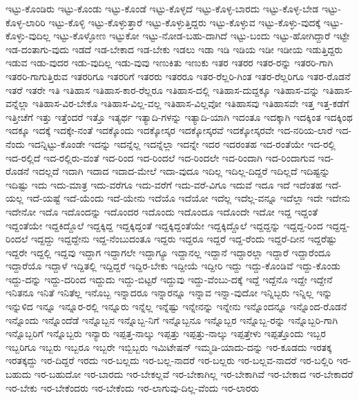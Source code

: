 {ಇಟ್ಟು-ಕೊಂಡಿರು
ಇಟ್ಟು-ಕೊಂಡು
ಇಟ್ಟು-ಕೊಂಡೆ
ಇಟ್ಟು-ಕೊಳ್ಳದೆ
ಇಟ್ಟು-ಕೊಳ್ಳ-ಬಾರದು
ಇಟ್ಟು-ಕೊಳ್ಳ-ಬೇಡ
ಇಟ್ಟು-ಕೊಳ್ಳ-ಲಾರಿರಿ
ಇಟ್ಟು-ಕೊಳ್ಳಿ
ಇಟ್ಟು-ಕೊಳ್ಳುತ್ತಾರೆ
ಇಟ್ಟು-ಕೊಳ್ಳುತ್ತಿದ್ದರು
ಇಟ್ಟು-ಕೊಳ್ಳುವ
ಇಟ್ಟು-ಕೊಳ್ಳು-ವುದಕ್ಕೆ
ಇಟ್ಟು-ಕೊಳ್ಳು-ವುದಿಲ್ಲ
ಇಟ್ಟು-ಕೊಳ್ಳೋಣ
ಇಟ್ಟುಕೋ
ಇಟ್ಟು-ನೋಡ-ಬಹು-ದಾಗಿದೆ
ಇಟ್ಟು-ಬಂದು
ಇಟ್ಟು-ಹೋಗಿದ್ದಾರೆ
ಇಟ್ಟೇ
ಇಡ-ದಂತಾಗು-ವುದು
ಇಡದೆ
ಇಡ-ಬೇಕಾದ
ಇಡ-ಬೇಕು
ಇಡಲು
ಇಡಾ
ಇಡಿ
ಇಡಿಯ
ಇಡೀ
ಇಡೀಯ
ಇಡುತ್ತಿದ್ದರು
ಇಡುವ
ಇಡು-ವುದರ
ಇಡು-ವುದಿಲ್ಲ
ಇಡು-ವುವು
ಇಣುಕಿತು
ಇಣುಕು
ಇತರ
ಇತರರ
ಇತರ-ರನ್ನು
ಇತರರಿ-ಗಾಗಿ
ಇತರರಿ-ಗಾಗುತ್ತಿರುವ
ಇತರರಿಗೂ
ಇತರರಿಗೆ
ಇತರರು
ಇತರರೂ
ಇತರ-ರೆಲ್ಲರಿ-ಗಿಂತ
ಇತರ-ರೆಲ್ಲರಿಗೂ
ಇತರ-ರೊಡನೆ
ಇತರೆ
ಇತರೇ
ಇತಿ
ಇತಿಹಾಸ
ಇತಿಹಾಸ-ಕಾರ-ರೆಲ್ಲರೂ
ಇತಿಹಾಸ-ದಲ್ಲಿ
ಇತಿಹಾಸ-ದುದ್ದಕ್ಕೂ
ಇತಿಹಾಸ-ವನ್ನು
ಇತಿಹಾಸ-ವನ್ನೆಲ್ಲಾ
ಇತಿಹಾಸ-ವಿರ-ಬೇಕೊ
ಇತಿಹಾಸ-ವಿಲ್ಲ-ವಲ್ಲ
ಇತಿಹಾಸ-ವಿಲ್ಲವೋ
ಇತಿಹಾಸವು
ಇತಿಹಾಸವೇ
ಇತ್ತ
ಇತ್ತ-ಕಡೆಗೆ
ಇತ್ತೀಚೆಗೆ
ಇತ್ತು
ಇತ್ತೆಂದರೆ
ಇತ್ತೊ
ಇತ್ಯರ್ಥ
ಇತ್ಯಾದಿ-ಗಳನ್ನು
ಇತ್ಯಾದಿ-ಯಾಗಿ
ಇದಂತೂ
ಇದಕ್ಕಾಗಿ
ಇದಕ್ಕಿಂತ
ಇದಕ್ಕಿಂಥ
ಇದಕ್ಕೂ
ಇದಕ್ಕೆ
ಇದಕ್ಕೇ-ನಂತೆ
ಇದಕ್ಕೊಂದು
ಇದಕ್ಕೋಸ್ಕರ
ಇದಕ್ಕೋಸ್ಕರವೆ
ಇದಕ್ಕೋಸ್ಕರವೇ
ಇದ-ನರಿಯ-ಲಾರೆ
ಇದ-ನೆಂದು
ಇದನ್ನಿಟ್ಟು-ಕೊಂಡೇ
ಇದನ್ನು
ಇದನ್ನೆಲ್ಲ
ಇದನ್ನೆಲ್ಲಾ
ಇದನ್ನೇ
ಇದರ
ಇದರಂತಹ
ಇದ-ರಂತೆಯೇ
ಇದ-ರಲ್ಲಿ
ಇದ-ರಲ್ಲಿದೆ
ಇದ-ರಲ್ಲಿರು-ವಂತೆ
ಇದ-ರಿಂದ
ಇದ-ರಿಂದಲೆ
ಇದ-ರಿಂದಲೇ
ಇದ-ರಿಂದಾಗಿ
ಇದ-ರಿಂದಾಗುವ
ಇದ-ರೊಡನೆ
ಇದಲ್ಲದೆ
ಇದಾಗಿ
ಇದಾದ
ಇದಾದ-ಮೇಲೆ
ಇದಾ-ವುದೂ
ಇದಿಲ್ಲ
ಇದಿಲ್ಲ-ದಿದ್ದರೆ
ಇದಿಲ್ಲದೆ
ಇದಿಷ್ಟನ್ನು
ಇದಿಷ್ಟು
ಇದು
ಇದು-ಮಾತ್ರ
ಇದು-ವರೆಗೂ
ಇದು-ವರೆಗೆ
ಇದು-ವರೆ-ವಿಗೂ
ಇದುವೆ
ಇದೂ
ಇದೆ
ಇದೆಂತಹ
ಇದೆ-ಯಲ್ಲ
ಇದೆ-ಯಷ್ಟೆ
ಇದೆ-ಯೆಂದು
ಇದೆ-ಯೇನು
ಇದೆಯೊ
ಇದೆಯೋ
ಇದೆಲ್ಲ
ಇದೆಲ್ಲ-ವನ್ನೂ
ಇದೆಲ್ಲಾ
ಇದೇ
ಇದೇನು
ಇದೇನೋ
ಇದೊ
ಇದೊಂದನ್ನು
ಇದೊಂದರ
ಇದೊಂದು
ಇದೊಂದೂ
ಇದೊಂದೇ
ಇದೋ
ಇದ್ದ
ಇದ್ದಂತೆ
ಇದ್ದಂತೆಯೇ
ಇದ್ದಕಿದ್ದೊಲೆ
ಇದ್ದಕ್ಕಿದ್ದ
ಇದ್ದಕ್ಕಿದ್ದಂತೆ
ಇದ್ದಕ್ಕಿದ್ದಂತೆಯೇ
ಇದ್ದಕ್ಕಿದ್ದೊಲೆ
ಇದ್ದದ್ದನ್ನು
ಇದ್ದದ್ದ-ರಿಂದ
ಇದ್ದದ್ದ-ರಿಂದಲೆ
ಇದ್ದದ್ದು
ಇದ್ದದ್ದೇನು
ಇದ್ದ-ನೆಂಬುದಂತೂ
ಇದ್ದರು
ಇದ್ದರೂ
ಇದ್ದರೆ
ಇದ್ದ-ರೆಂದು
ಇದ್ದರೆ-ದೀನ
ಇದ್ದರೆಷ್ಟು
ಇದ್ದರೇ
ಇದ್ದಲ್ಲಿ
ಇದ್ದವು
ಇದ್ದಾಗ
ಇದ್ದಾಗಲೇ
ಇದ್ದಾಗ್ಯೂ
ಇದ್ದಾನಲ್ಲ
ಇದ್ದಾನೆ
ಇದ್ದಾರಲ್ಲಾ
ಇದ್ದಾರೆ
ಇದ್ದಾರೆಂದೂ
ಇದ್ದಾರೆಯೊ
ಇದ್ದಾಳೆ
ಇದ್ದಿತಲ್ಲಿ
ಇದ್ದಿದ್ದರೆ
ಇದ್ದಿರ-ಬೇಕು
ಇದ್ದೀಯೆ
ಇದ್ದೀರಿ
ಇದ್ದು
ಇದ್ದು-ಕೊಂಡಿವೆ
ಇದ್ದು-ಕೊಂಡು
ಇದ್ದು-ದನ್ನು
ಇದ್ದು-ದರಿಂದ
ಇದ್ದುದು
ಇದ್ದು-ಬಿಟ್ಟರೆ
ಇದ್ದುವು
ಇದ್ದು-ವೆಂಬು-ದಕ್ಕೆ
ಇದ್ದೆ
ಇದ್ದೆನೊ
ಇದ್ದೇ
ಇದ್ದೇನೆ
ಇನಿತನೂ
ಇನಿತೆ
ಇನಿತೆಲ್ಲ
ಇನೊಬ್ಬ
ಇನ್ನಾದರೂ
ಇನ್ನಾರನ್ನೂ
ಇನ್ನಾವ
ಇನ್ನಾ-ವುದೋ
ಇನ್ನಿಬ್ಬರು
ಇನ್ನಿಲ್ಲ
ಇನ್ನು
ಇನ್ನುಳಿದ
ಇನ್ನೂ
ಇನ್ನೂರ-ರಲ್ಲಿ
ಇನ್ನೂರು
ಇನ್ನೆಲ್ಲ
ಇನ್ನೆಷ್ಟು
ಇನ್ನೇನನ್ನು
ಇನ್ನೇನು
ಇನ್ನೊಂದನ್ನೂ
ಇನ್ನೊಂದ-ರೊಡನೆ
ಇನ್ನೊಂದು
ಇನ್ನೊಂದೆಡೆ
ಇನ್ನೊಬ್ಬನ
ಇನ್ನೊಬ್ಬ-ನಿಗೆ
ಇನ್ನೊಬ್ಬನೂ
ಇನ್ನೊಬ್ಬರ
ಇನ್ನೊಬ್ಬ-ರನ್ನು
ಇನ್ನೊಬ್ಬರಿ-ಗಾಗಿ
ಇನ್ನೊಬ್ಬರಿಗೆ
ಇನ್ನೊಬ್ಬರು
ಇನ್ಯಾರು
ಇಪ್ಪತ್ತ-ನಾಲ್ಕು
ಇಪ್ಪತ್ತು
ಇಪ್ಪತ್ತು-ನಾಲ್ಕು
ಇಪ್ಪತ್ತೇಳು
ಇಪ್ಪತ್ತೊಂದು
ಇಬ್ಬರ
ಇಬ್ಬರಿಗೂ
ಇಬ್ಬರು
ಇಬ್ಬರೂ
ಇಬ್ಬರೇ
ಇಬ್ಬಿಬ್ಬರು
ಇಮಿಟೇಷನ್
ಇಮ್ಮಡಿ-ಯಾದು-ದನ್ನು
ಇರ-ಕೂಡದು
ಇರತಕ್ಕ
ಇರತಕ್ಕದ್ದು
ಇರ-ದಿದ್ದರೆ
ಇರದು
ಇರ-ಬಲ್ಲದು
ಇರ-ಬಲ್ಲ-ನಾದರೆ
ಇರ-ಬಲ್ಲರು
ಇರ-ಬಲ್ಲವ-ನಾದರೆ
ಇರ-ಬಲ್ಲಿರಿ
ಇರ-ಬಹುದು
ಇರ-ಬಹುದೋ
ಇರ-ಬಾರದು
ಇರ-ಬೇಕಲ್ಲವೆ
ಇರ-ಬೇಕಾಗಿಲ್ಲ
ಇರ-ಬೇಕಾಗಿವೆ
ಇರ-ಬೇಕಾದ
ಇರ-ಬೇಕಾದರೆ
ಇರ-ಬೇಕು
ಇರ-ಬೇಕೆಂದರು
ಇರ-ಬೇಕೆಂದು
ಇರ-ಲಾಗುವು-ದಿಲ್ಲ-ವೆಂದು
ಇರ-ಲಾರರು
}
